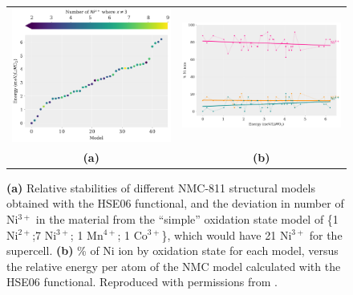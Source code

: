 \documentclass[journal=jacsat,manuscript=article]{achemso}
\begin{document}
\begin{figure}[tb]
  \begin{center}
  \begin{tabular}{c c}
  \includegraphics[width=0.46\columnwidth]{Figures/HSE_energy_cmap.pdf}&\includegraphics[width=0.46\columnwidth]{Figures/Ni_ox_vs_E.pdf}\\
  \textbf{(a)}&\textbf{(b)}\\
   \end{tabular}
    \caption{\label{fig:stability} \textbf{(a)} Relative stabilities of different NMC-811 structural models obtained with the HSE06 functional, and the deviation in number of Ni$^{3+}$ in the material from the ``simple'' oxidation state model of \{1 Ni$^{2+}$;7 Ni$^{3+}$; 1 Mn$^{4+}$; 1 Co$^{3+}$\}, which would have 21 Ni$^{3+}$ for the supercell. \textbf{(b)} \% of Ni ion by oxidation state for each model, versus the relative energy per atom of the NMC model calculated with the HSE06 functional. Reproduced with permissions from . }
    \end{center}
\end{figure}
\end{document}
